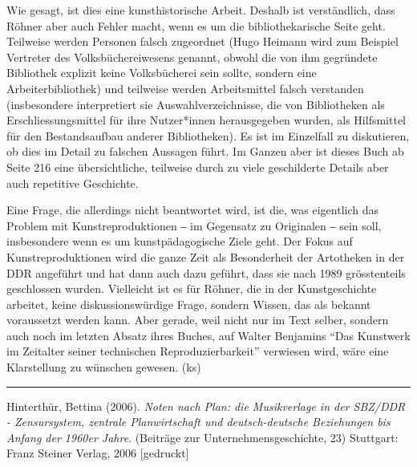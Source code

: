 \documentclass[a4paper,
fontsize=11pt,
oneside,
numbers=noperiodatend,
parskip=half-,
bibliography=totoc,
final
]{scrartcl}
\begin{document}
Wie gesagt, ist dies eine kunsthistorische Arbeit. Deshalb ist
verständlich, dass Röhner aber auch Fehler macht, wenn es um die
bibliothekarische Seite geht. Teilweise werden Personen falsch
zugeordnet (Hugo Heimann wird zum Beispiel Vertreter des
Volksbüchereiwesens genannt, obwohl die von ihm gegründete Bibliothek
explizit keine Volksbücherei sein sollte, sondern eine
Arbeiterbibliothek) und teilweise werden Arbeitsmittel falsch verstanden
(insbesondere interpretiert sie Auswahlverzeichnisse, die von
Bibliotheken als Erschliessungsmittel für ihre Nutzer*innen
herausgegeben wurden, als Hilfsmittel für den Bestandsaufbau anderer
Bibliotheken). Es ist im Einzelfall zu diskutieren, ob dies im Detail zu
falschen Aussagen führt. Im Ganzen aber ist dieses Buch ab Seite 216
eine übersichtliche, teilweise durch zu viele geschilderte Details aber
auch repetitive Geschichte.

Eine Frage, die allerdings nicht beantwortet wird, ist die, was
eigentlich das Problem mit Kunstreproduktionen ‒ im Gegensatz zu
Originalen ‒ sein soll, insbesondere wenn es um kunstpädagogische Ziele
geht. Der Fokus auf Kunstreproduktionen wird die ganze Zeit als
Besonderheit der Artotheken in der DDR angeführt und hat dann auch dazu
geführt, dass sie nach 1989 grösstenteils geschlossen wurden. Vielleicht
ist es für Röhner, die in der Kunstgeschichte arbeitet, keine
diskussionswürdige Frage, sondern Wissen, das als bekannt voraussetzt
werden kann. Aber gerade, weil nicht nur im Text selber, sondern auch
noch im letzten Absatz ihres Buches, auf Walter Benjamins \enquote{Das
Kunstwerk im Zeitalter seiner technischen Reproduzierbarkeit} verwiesen
wird, wäre eine Klarstellung zu wünschen gewesen. (ks)

\begin{center}\rule{0.5\linewidth}{0.5pt}\end{center}

Hinterthür, Bettina (2006). \emph{Noten nach Plan: die Musikverlage in
der SBZ/DDR - Zensursystem, zentrale Planwirtschaft und deutsch-deutsche
Beziehungen bis Anfang der 1960er Jahre}. (Beiträge zur
Unternehmensgeschichte, 23) Stuttgart: Franz Steiner Verlag, 2006
{[}gedruckt{]}
\end{document}
